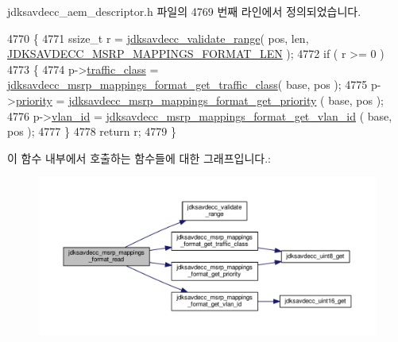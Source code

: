 jdksavdecc\+\_\+aem\+\_\+descriptor.\+h 파일의 4769 번째 라인에서 정의되었습니다.


\begin{DoxyCode}
4770 \{
4771     ssize\_t r = \hyperlink{group__util_ga9c02bdfe76c69163647c3196db7a73a1}{jdksavdecc\_validate\_range}( pos, len, 
      \hyperlink{group__msrp__mappings__format_ga4ec95c1f1d0677ac9a1f6edae29fad0c}{JDKSAVDECC\_MSRP\_MAPPINGS\_FORMAT\_LEN} );
4772     \textcolor{keywordflow}{if} ( r >= 0 )
4773     \{
4774         p->\hyperlink{structjdksavdecc__msrp__mappings__format_af92a6e10a8b9f2e12a072402f1be80c4}{traffic\_class} = 
      \hyperlink{group__msrp__mappings__format_ga36383f5d5db3a07921dc2711eceebea9}{jdksavdecc\_msrp\_mappings\_format\_get\_traffic\_class}( base, 
      pos );
4775         p->\hyperlink{structjdksavdecc__msrp__mappings__format_a0ad043071ccc7a261d79a759dc9c6f0c}{priority} = \hyperlink{group__msrp__mappings__format_gad9e1418b7d0b6eb270b264809c1a48af}{jdksavdecc\_msrp\_mappings\_format\_get\_priority}
      ( base, pos );
4776         p->\hyperlink{structjdksavdecc__msrp__mappings__format_ad9a532da576820f8630b96c16692aa5a}{vlan\_id} = \hyperlink{group__msrp__mappings__format_ga2aae8fb990633570010e5bfb863e1b93}{jdksavdecc\_msrp\_mappings\_format\_get\_vlan\_id}
      ( base, pos );
4777     \}
4778     \textcolor{keywordflow}{return} r;
4779 \}
\end{DoxyCode}


이 함수 내부에서 호출하는 함수들에 대한 그래프입니다.\+:
\nopagebreak
\begin{figure}[H]
\begin{center}
\leavevmode
\includegraphics[width=350pt]{group__msrp__mappings__format_ga1a58afb7a513efbd40a69b0ebf5d5276_cgraph}
\end{center}
\end{figure}


